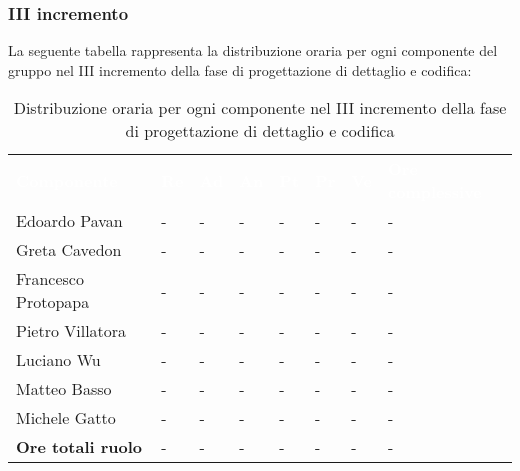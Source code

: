\subsubsection{III incremento}
La seguente tabella rappresenta la distribuzione oraria per ogni componente del gruppo nel III incremento della fase di progettazione di dettaglio e codifica:
\begin{table}[!htbp]
\begin{center}
\renewcommand{\arraystretch}{1.25}
\begin{tabular}{ m{}<{\centering}  m{}<{\centering} m{}<{\centering} m{}<{\centering}  m{}<{\centering}  m{}<{\centering}  m{}<{\centering}  m{}<{\centering}   }
	\rowcolor{darkblue}
	\textcolor{white}{\textbf{Componente}} &\textcolor{white}{\textbf{Re}}&\textcolor{white}{\textbf{Ad}}&\textcolor{white}{\textbf{An}}&\textcolor{white}{\textbf{Pt}}&\textcolor{white}{\textbf{Pr}}&\textcolor{white}{\textbf{Ve}}&\textcolor{white}{\textbf{Ore complessive}}\\ 

	Edoardo Pavan & - & - & - & - & - & - & -\\	

	Greta Cavedon & - & - & - & - & - & - & -\\
	
	Francesco Protopapa & - & - & - & - & - & - & -\\
	
	Pietro Villatora & - & - & - & - & - & - & -\\
	
	Luciano Wu & - & - & - & - & - & - & -\\
	
	Matteo Basso & - & - & - & - & - & - & -\\
	
	Michele Gatto & - & - & - & - & - & - & -\\
	
	\textbf{Ore totali ruolo} & - & - & - & - & - & - & -\\

\end{tabular}
\caption{Distribuzione oraria per ogni componente nel III incremento della fase di progettazione di dettaglio e codifica}
\end{center}
\end{table}

